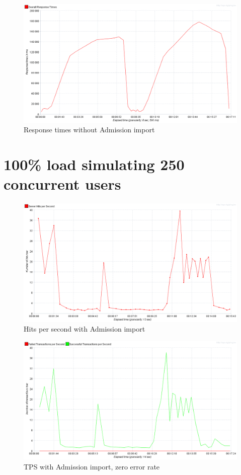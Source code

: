 	\begin{figure}[h]
		\label{fig:jmeter:response_times_over_time_125_without_admission_import}
		\centering
		\includegraphics[width=12cm]{figures/jmeter/response_times_over_time_125_without_admission_import}
		\caption{Response times without Admission import}
	\end{figure}

	\section{100\% load simulating 250 concurrent users}	

	\begin{figure}[h]
		\label{fig:jmeter:hits_per_second_250_with_admission_import}
		\centering
		\includegraphics[width=12cm]{figures/jmeter/hits_per_second_250_with_admission_import}
		\caption{Hits per second with Admission import}
	\end{figure}

	\begin{figure}[h]
		\label{fig:jmeter:tps_250_with_admission_import}
		\centering
		\includegraphics[width=12cm]{figures/jmeter/tps_250_with_admission_import}
		\caption{TPS with Admission import, zero error rate}
	\end{figure}

